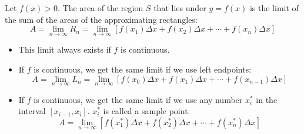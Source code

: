 \begin{frame}
\begin{definition}
Let $f(x)>0$. The area of the region $S$ that lies under $y = f(x)$ is the limit of the sum of the areas of the approximating rectangles:
\abovedisplayskip=0pt
\belowdisplayskip=0pt
\[
A = \lim_{n\to\infty} R_n = \lim_{n\to\infty} [ f(x_1)\Delta x + f(x_2) \Delta x + \cdots + f(x_n) \Delta x]
\]
\end{definition}
\begin{itemize}
\item<2->  This limit always exists if $f$ is continuous.
\item<3->  If $f$ is continuous, we get the same limit if we use left endpoints:
\abovedisplayskip=0pt
\belowdisplayskip=0pt
\[
A = \lim_{n\to\infty} L_n = \lim_{n\to\infty} [ f(x_0)\Delta x + f(x_1) \Delta x + \cdots + f(x_{n-1}) \Delta x]
\]
\item<4->  If $f$ is continuous, we get the same limit if we use any number $x_i^*$ in the interval $[x_{i-1},x_i]$.  $x_i^*$ is called a sample point.
\abovedisplayskip=0pt
\belowdisplayskip=0pt
\[
A = \lim_{n\to\infty} [ f(x_1^*)\Delta x + f(x_2^*) \Delta x + \cdots + f(x_{n}^*) \Delta x]
\]
\end{itemize}
%
\end{frame}

